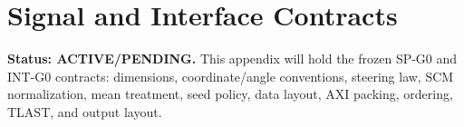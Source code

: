 \chapter{Signal and Interface Contracts}
\textbf{Status: ACTIVE/PENDING.} This appendix will hold the frozen SP-G0 and INT-G0
contracts: dimensions, coordinate/angle conventions, steering law, SCM normalization,
mean treatment, seed policy, data layout, AXI packing, ordering, TLAST, and output layout.
